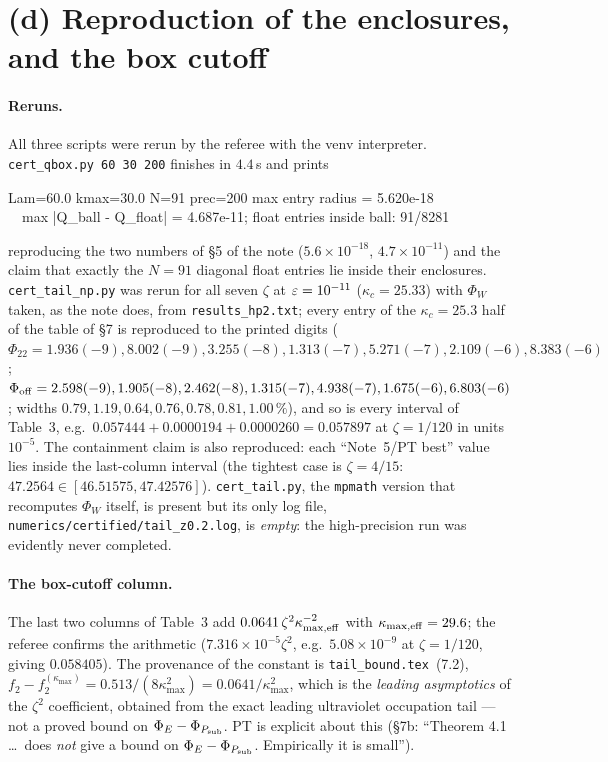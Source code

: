 \documentclass[11pt]{article}
\begin{document}
\section{(d) Reproduction of the enclosures, and the box cutoff}\label{sec:rerun}

\paragraph{Reruns.}  All three scripts were rerun by the referee with the venv interpreter.
\texttt{cert\_qbox.py 60 30 200} finishes in $4.4$\,s and prints
\begin{center}\small\ttfamily
Lam=60.0 kmax=30.0 N=91 prec=200  max entry radius = 5.620e-18\\
\ \ max |Q\_ball - Q\_float| = 4.687e-11;  float entries inside ball: 91/8281
\end{center}
reproducing the two numbers of \S5 of the note ($5.6\times10^{-18}$, $4.7\times10^{-11}$) and the
claim that exactly the $N=91$ diagonal float entries lie inside their enclosures.
\texttt{cert\_tail\_np.py} was rerun for all seven $\zeta$ at $\varepsilon=10^{-11}$ ($\kappa_c=25.33$) with
$\Phi_W$ taken, as the note does, from \texttt{results\_hp2.txt}; every entry of the
$\kappa_c=25.3$ half of the table of \S7 is reproduced to the printed digits
($\Phi_{22}=1.936(-9),8.002(-9),3.255(-8),1.313(-7),5.271(-7),2.109(-6),8.383(-6)$;
$\Phi_{\rm off}=2.598(-9),1.905(-8),2.462(-8),1.315(-7),4.938(-7),1.675(-6),6.803(-6)$; widths
$0.79,1.19,0.64,0.76,0.78,0.81,1.00\,\%$), and so is every interval of Table~3, e.g.\
$0.057444+0.0000194+0.0000260=0.057897$ at $\zeta=1/120$ in units $10^{-5}$.  The
containment claim is also reproduced: each ``Note~5/PT best'' value lies inside the last-column
interval (the tightest case is $\zeta=4/15$: $47.2564\in[46.51575,47.42576]$).
\texttt{cert\_tail.py}, the \texttt{mpmath} version that recomputes $\Phi_W$ itself, is present but
its only log file, \texttt{numerics/certified/tail\_z0.2.log}, is \emph{empty}: the high-precision
run was evidently never completed.

\paragraph{The box-cutoff column.}  The last two columns of Table~3 add
$0.0641\,\zeta^2\kappa_{\max,\rm eff}^{-2}$ with $\kappa_{\max,\rm eff}=29.6$; the referee confirms
the arithmetic ($7.316\times10^{-5}\zeta^2$, e.g.\ $5.08\times10^{-9}$ at $\zeta=1/120$, giving
$0.058405$).  The provenance of the constant is \texttt{tail\_bound.tex}~(7.2),
$f_2-f_2^{(\kappa_{\max})}=0.513/(8\kappa_{\max}^2)=0.0641/\kappa_{\max}^2$, which is the
\emph{leading asymptotics} of the $\zeta^2$ coefficient, obtained from the exact leading ultraviolet
occupation tail --- not a proved bound on $\Phi_E-\Phi_{P_{\rm sub}}$.  PT is explicit about this
(\S7b: ``Theorem 4.1 \ldots\ does \emph{not} give a bound on $\Phi_E-\Phi_{P_{\rm sub}}$.
Empirically it is small'').
\end{document}
